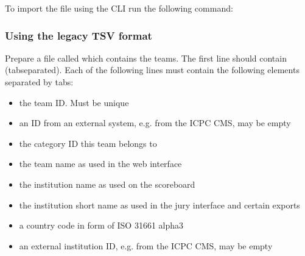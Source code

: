 \documentclass[a4paper,10pt,english,openany]{sphinxmanual}
\begin{document}
\begin{sphinxVerbatim}[commandchars=\\\{\}]
      
\end{sphinxVerbatim}

\sphinxAtStartPar
To import the file using the CLI run the following command:

\begin{sphinxVerbatim}[commandchars=\\\{\}]
      
\end{sphinxVerbatim}


\subsubsection{Using the legacy TSV format}
\label{\detokenize{import:id2}}
\sphinxAtStartPar
Prepare a file called  which contains the teams.
The first line should contain  (tab\sphinxhyphen{}separated).
Each of the following lines must contain the following elements separated by tabs:
\begin{itemize}
\item {} 
\sphinxAtStartPar
the team ID. Must be unique

\item {} 
\sphinxAtStartPar
an ID from an external system, e.g. from the ICPC CMS, may be empty

\item {} 
\sphinxAtStartPar
the category ID this team belongs to

\item {} 
\sphinxAtStartPar
the team name as used in the web interface

\item {} 
\sphinxAtStartPar
the institution name as used on the scoreboard

\item {} 
\sphinxAtStartPar
the institution short name as used in the jury interface and certain exports

\item {} 
\sphinxAtStartPar
a country code in form of ISO 3166\sphinxhyphen{}1 alpha\sphinxhyphen{}3

\item {} 
\sphinxAtStartPar
an external institution ID, e.g. from the ICPC CMS, may be empty

\end{itemize}
\end{document}
